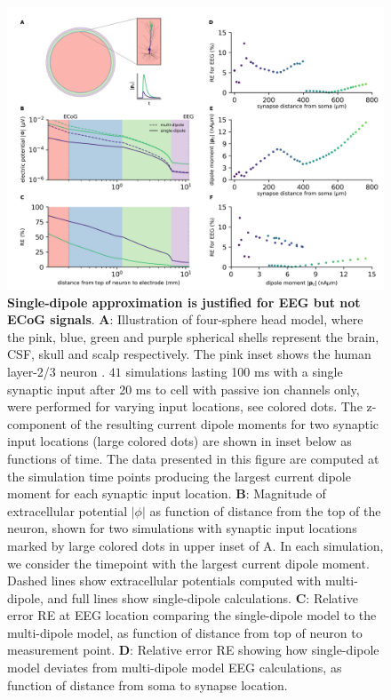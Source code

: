 \documentclass[preprint,10pt,authoryear]{elsarticle}
\newcommand{\hlg}[2][Emerald]{ {\sethlcolor{#1} \hl{#2}} }
\newcommand{\sntxt}[1]{{\color{NavyBlue}#1}}
\newcommand{\tvnnote}[1]{\color{white}{\hlg{TVN: #1 }}\color{black}}
\begin{document}
\begin{figure}[H]
	\centering
	\includegraphics[width=1.0\textwidth]{figure2.png}
	\caption{\textbf{Single-dipole approximation is justified for EEG but not ECoG signals}. 
		\textbf{A}: Illustration of four-sphere head model, where the pink, blue, green and purple spherical shells represent the brain, CSF, skull and scalp respectively. The pink inset shows the human layer-2/3 neuron \citep{EYAL2016}. $41$ simulations lasting 100 ms with a single synaptic input after 20 ms to cell with passive ion channels only, were performed for varying input locations, see colored dots. \sntxt{The z-component of the resulting current dipole moments for two synaptic input locations (large colored dots) are shown in inset below as functions of time. The data presented in this figure are computed at the simulation time points producing the largest current dipole moment for each synaptic input location.}
		\textbf{B}: Magnitude of extracellular potential $|\phi|$ as function of distance from the top of the neuron, shown for two simulations with synaptic input locations marked by large colored dots in upper inset of A. In each simulation, we consider the timepoint with the largest current dipole moment. Dashed lines show extracellular potentials computed with multi-dipole, and full lines show single-dipole calculations.
		\textbf{C}: Relative error RE at EEG location comparing the single-dipole model to the multi-dipole model, as function of distance from top of neuron to measurement point.
		\textbf{D}: Relative error RE showing how single-dipole model deviates from multi-dipole model EEG calculations, as function of distance from soma to synapse location.
}
\end{figure}
\end{document}
